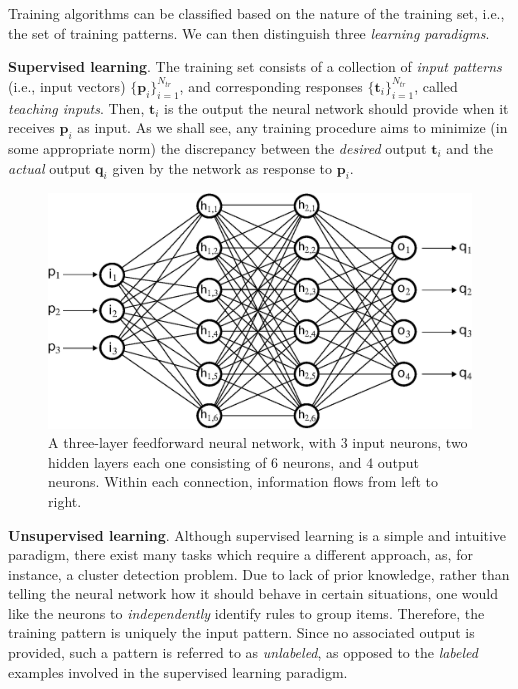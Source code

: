 \documentclass[12pt, a4paper, twoside, openright, notitlepage]{report}
\numberwithin{equation}{chapter}
\theoremstyle{theorem}
\theoremstyle{definition}
\theoremstyle{remark}
\theoremstyle{proposition}
\numberwithin{figure}{chapter}
\begin{document}
		Training algorithms can be classified based on the nature of the training set, i.e., the set of training patterns. We can then distinguish three \emph{learning paradigms}.
		
		\vspace*{0.3cm}
		
		\noindent \textbf{Supervised learning}. The training set consists of a collection of \emph{input patterns} (i.e., input vectors) $\big\lbrace \mathbf{p}_i \big\rbrace_{i = 1}^{N_{tr}}$, and corresponding responses $\big\lbrace \mathbf{t}_i \big\rbrace_{i = 1}^{N_{tr}}$, called \emph{teaching inputs}. Then, $\mathbf{t}_i$ is the output the neural network should provide when it receives $\mathbf{p}_i$ as input. As we shall see, any training procedure aims to minimize (in some appropriate norm) the discrepancy between the \emph{desired} output $\mathbf{t}_i$ and the \emph{actual} output $\mathbf{q}_i$ given by the network as response to $\mathbf{p}_i$. 
		
		\vspace*{0.3cm}
		
		\begin{figure}[t]
			\center
			\includegraphics[scale = 0.6]{neural_network_bis.eps}
			
			\caption{A three-layer feedforward neural network, with $3$ input neurons, two hidden layers each one consisting of $6$ neurons, and $4$ output neurons. Within each connection, information flows from left to right.}
			\label{fig:neural-network}
		\end{figure}
		
		\noindent \textbf{Unsupervised learning}. Although supervised learning is a simple and intuitive paradigm, there exist many tasks which require a different approach, as, for instance, a cluster detection problem. Due to lack of prior knowledge, rather than telling the neural network how it should behave in certain situations, one would like the neurons to \emph{independently} identify rules to group items. Therefore, the training pattern is uniquely the input pattern. Since no associated output is provided, such a pattern is referred to as \emph{unlabeled}, as opposed to the \emph{labeled} examples involved in the supervised learning paradigm.
		
\end{document}
